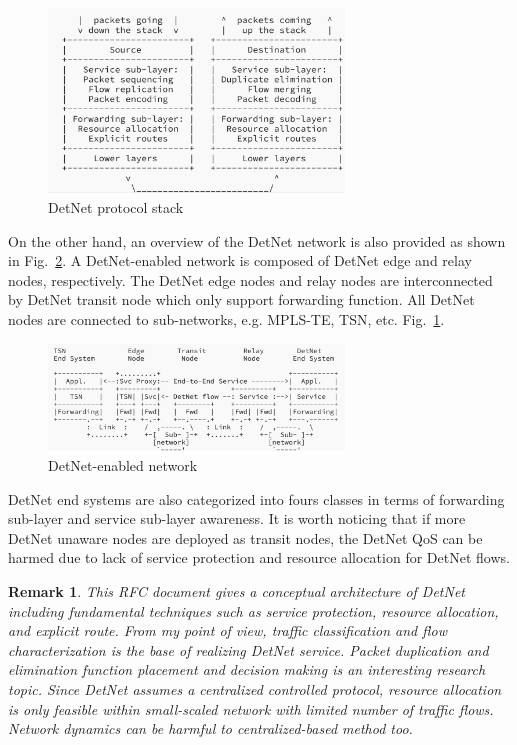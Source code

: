 \documentclass[12pt]{article}
\newtheorem*{remark}{Remark}
\begin{document}
\begin{figure}
    \centering
    \includegraphics[width = 0.7\textwidth ]{Figures/DetNet protocol stack.png}
    \caption{DetNet protocol stack}
    \label{fig:stack}
\end{figure}

On the other hand, an overview of the DetNet network is also provided as shown in Fig.~\ref{fig:network}. A DetNet-enabled network is composed of DetNet edge and relay nodes, respectively. The DetNet edge nodes and relay nodes are interconnected by DetNet transit node which only support forwarding function. All DetNet nodes are connected to sub-networks, e.g. MPLS-TE, TSN, etc. 
Fig.~\ref{fig:stack}. 
\begin{figure}
    \centering
    \includegraphics[width = 0.7\textwidth ]{Figures/DetNet overview.png}
    \caption{DetNet-enabled network}
    \label{fig:network}
\end{figure}
DetNet end systems are also categorized into fours classes in terms of forwarding sub-layer and service sub-layer awareness. It is worth noticing that if more DetNet unaware nodes are deployed as transit nodes, the DetNet QoS can be harmed due to lack of service protection and resource allocation for DetNet flows.

\begin{remark}
This RFC document gives a conceptual architecture of DetNet including fundamental techniques such as service protection, resource allocation, and explicit route. From my point of view, traffic classification and flow characterization is the base of realizing DetNet service. Packet duplication and elimination function placement and decision making is an interesting research topic. Since DetNet assumes a centralized controlled protocol, resource allocation is only feasible within small-scaled network with limited number of traffic flows. Network dynamics can be harmful to centralized-based method too. 
\end{remark}
\end{document}
